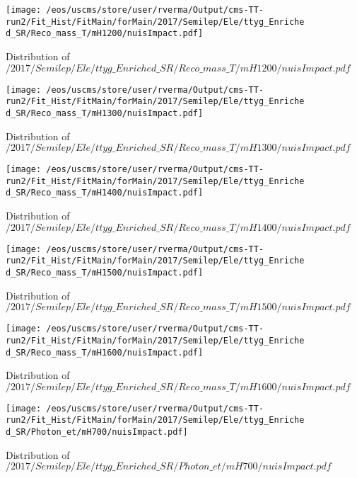 \begin{figure}
\centering
\texttt{[image: /eos/uscms/store/user/rverma/Output/cms-TT-run2/Fit\_Hist/FitMain/forMain/2017/Semilep/Ele/ttyg\_Enriched\_SR/Reco\_mass\_T/mH1200/nuisImpact.pdf]}
\caption{Distribution of $/2017/Semilep/Ele/ttyg\_Enriched\_SR/Reco\_mass\_T/mH1200/nuisImpact.pdf$}
\end{figure}

\begin{figure}
\centering
\texttt{[image: /eos/uscms/store/user/rverma/Output/cms-TT-run2/Fit\_Hist/FitMain/forMain/2017/Semilep/Ele/ttyg\_Enriched\_SR/Reco\_mass\_T/mH1300/nuisImpact.pdf]}
\caption{Distribution of $/2017/Semilep/Ele/ttyg\_Enriched\_SR/Reco\_mass\_T/mH1300/nuisImpact.pdf$}
\end{figure}

\begin{figure}
\centering
\texttt{[image: /eos/uscms/store/user/rverma/Output/cms-TT-run2/Fit\_Hist/FitMain/forMain/2017/Semilep/Ele/ttyg\_Enriched\_SR/Reco\_mass\_T/mH1400/nuisImpact.pdf]}
\caption{Distribution of $/2017/Semilep/Ele/ttyg\_Enriched\_SR/Reco\_mass\_T/mH1400/nuisImpact.pdf$}
\end{figure}

\begin{figure}
\centering
\texttt{[image: /eos/uscms/store/user/rverma/Output/cms-TT-run2/Fit\_Hist/FitMain/forMain/2017/Semilep/Ele/ttyg\_Enriched\_SR/Reco\_mass\_T/mH1500/nuisImpact.pdf]}
\caption{Distribution of $/2017/Semilep/Ele/ttyg\_Enriched\_SR/Reco\_mass\_T/mH1500/nuisImpact.pdf$}
\end{figure}

\begin{figure}
\centering
\texttt{[image: /eos/uscms/store/user/rverma/Output/cms-TT-run2/Fit\_Hist/FitMain/forMain/2017/Semilep/Ele/ttyg\_Enriched\_SR/Reco\_mass\_T/mH1600/nuisImpact.pdf]}
\caption{Distribution of $/2017/Semilep/Ele/ttyg\_Enriched\_SR/Reco\_mass\_T/mH1600/nuisImpact.pdf$}
\end{figure}

\begin{figure}
\centering
\texttt{[image: /eos/uscms/store/user/rverma/Output/cms-TT-run2/Fit\_Hist/FitMain/forMain/2017/Semilep/Ele/ttyg\_Enriched\_SR/Photon\_et/mH700/nuisImpact.pdf]}
\caption{Distribution of $/2017/Semilep/Ele/ttyg\_Enriched\_SR/Photon\_et/mH700/nuisImpact.pdf$}
\end{figure}

